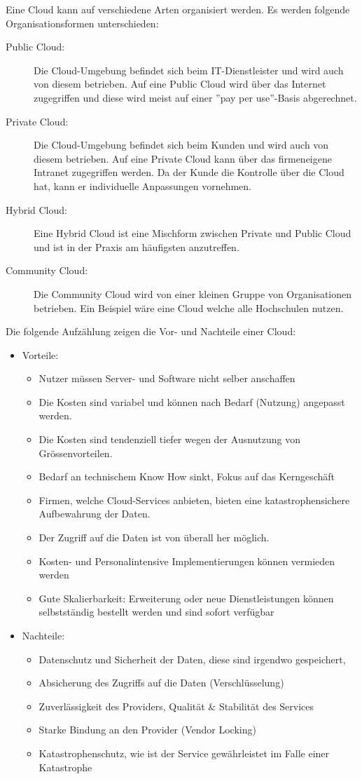 Eine Cloud kann auf verschiedene Arten organisiert werden. Es werden folgende Organisationsformen unterschieden:
\begin{description}
	\item[Public Cloud:] Die Cloud-Umgebung befindet sich beim IT-Dienstleister und wird auch von diesem betrieben. Auf eine Public Cloud wird über das Internet zugegriffen und diese wird meist auf einer ''pay per use''-Basis abgerechnet.
	\item[Private Cloud:] Die Cloud-Umgebung befindet sich beim Kunden und wird auch von diesem betrieben. Auf eine Private Cloud kann über das firmeneigene Intranet zugegriffen werden. Da der Kunde die Kontrolle über die Cloud hat, kann er individuelle Anpassungen vornehmen.
	\item[Hybrid Cloud:] Eine Hybrid Cloud ist eine Mischform zwischen Private und Public Cloud und ist in der Praxis am häufigsten anzutreffen.
	\item[Community Cloud:] Die Community Cloud wird von einer kleinen Gruppe von Organisationen betrieben. Ein Beispiel wäre eine Cloud welche alle Hochschulen nutzen.
\end{description}

Die folgende Aufzählung zeigen die Vor- und Nachteile einer Cloud:
\begin{itemize}
	\item Vorteile:
	\begin{itemize}
		\item Nutzer müssen Server- und Software nicht selber anschaffen
		\item Die Kosten sind variabel und können nach Bedarf (Nutzung) angepasst werden.
		\item Die Kosten sind tendenziell tiefer wegen der Ausnutzung von Grössenvorteilen.
		\item Bedarf an technischem Know How sinkt, Fokus auf das Kerngeschäft
		\item Firmen, welche Cloud-Services anbieten, bieten eine katastrophensichere Aufbewahrung der Daten.
		\item Der Zugriff auf die Daten ist von überall her möglich.
		\item Kosten- und Personalintensive Implementierungen können vermieden werden
		\item Gute Skalierbarkeit: Erweiterung oder neue Dienstleistungen können selbstständig bestellt werden und sind sofort verfügbar
	\end{itemize}
	\item Nachteile:
	\begin{itemize}
		\item Datenschutz und Sicherheit der Daten, diese sind irgendwo gespeichert,
		\item Absicherung des Zugriffs auf die Daten (Verschlüsselung)
		\item Zuverlässigkeit des Providers, Qualität \& Stabilität des Services
		\item Starke Bindung an den Provider (Vendor Locking)
		\item Katastrophenschutz, wie ist der Service gewährleistet im Falle einer Katastrophe
	\end{itemize}
\end{itemize}

